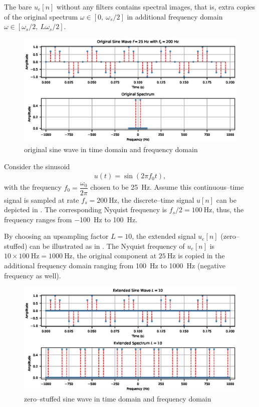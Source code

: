 The bare $u_e[n]$ without any filters contains spectral images, that is, extra copies of the original spectrum $\omega\in[0,~\omega_s/2]$ in additional frequency domain $\omega\in[\omega_s/2,~L\omega_s/2]$.
\begin{figure}[ht]
\centering
\includegraphics{PIC/PureSineOrigin}
\caption{original sine wave in time domain and frequency domain}\label{fig:original}
\end{figure}
Consider the sinusoid
\begin{gather}
u(t)=\sin\left(2\pi{}f_0t\right),
\end{gather}
with the frequency $f_0=\dfrac{\omega_0}{2\pi}$ chosen to be \SI{25}{\hertz}. Assume this continuous--time signal is sampled at rate $f_s=\SI{200}{\hertz}$, the discrete--time signal $u[n]$ can be depicted in . The corresponding Nyquist frequency is $f_s/2=\SI{100}{\hertz}$, thus, the frequency ranges from \SI{-100}{\hertz} to \SI{100}{\hertz}.

By choosing an upsampling factor $L=10$, the extended signal $u_e[n]$ (zero--stuffed) can be illustrated as in . The Nyquist frequency of $u_e[n]$ is $10\times\SI{100}{\hertz}=\SI{1000}{\hertz}$, the original component at $\SI{25}{\hertz}$ is copied in the additional frequency domain ranging from \SI{100}{\hertz} to \SI{1000}{\hertz} (negative frequency as well).
\begin{figure}[ht]
\centering
\includegraphics{PIC/PureSineExtended}
\caption{zero--stuffed sine wave in time domain and frequency domain}\label{fig:extended}
\end{figure}

